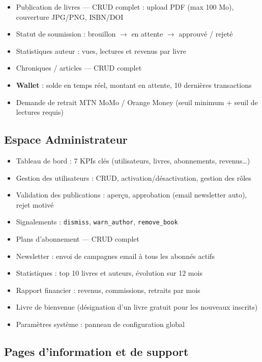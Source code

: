 \documentclass[12pt,a4paper]{article}
\newcommand{\cmark}{\textcolor{Vert}{\ding{51}}}
\begin{document}
\begin{itemize}
  \item[\cmark] Publication de livres — CRUD complet : upload PDF (max 100 Mo), couverture JPG/PNG, ISBN/DOI
  \item[\cmark] Statut de soumission : brouillon $\to$ en attente $\to$ approuvé / rejeté
  \item[\cmark] Statistiques auteur : vues, lectures et revenus par livre
  \item[\cmark] Chroniques / articles — CRUD complet
  \item[\cmark] \textbf{Wallet} : solde en temps réel, montant en attente, 10 dernières transactions
  \item[\cmark] Demande de retrait MTN MoMo / Orange Money (seuil minimum + seuil de lectures requis)
\end{itemize}

\subsection{Espace Administrateur}

\begin{itemize}
  \item[\cmark] Tableau de bord : 7 KPIs clés (utilisateurs, livres, abonnements, revenus…)
  \item[\cmark] Gestion des utilisateurs : CRUD, activation/désactivation, gestion des rôles
  \item[\cmark] Validation des publications : aperçu, approbation (email newsletter auto), rejet motivé
  \item[\cmark] Signalements : \texttt{dismiss}, \texttt{warn\_author}, \texttt{remove\_book}
  \item[\cmark] Plans d'abonnement — CRUD complet
  \item[\cmark] Newsletter : envoi de campagnes email à tous les abonnés actifs
  \item[\cmark] Statistiques : top 10 livres et auteurs, évolution sur 12 mois
  \item[\cmark] Rapport financier : revenus, commissions, retraits par mois
  \item[\cmark] Livre de bienvenue (désignation d'un livre gratuit pour les nouveaux inscrits)
  \item[\cmark] Paramètres système : panneau de configuration global
\end{itemize}

\subsection{Pages d'information et de support}
\end{document}
